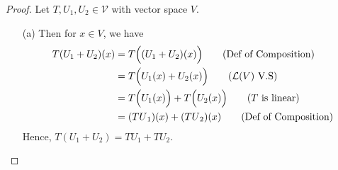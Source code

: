 \begin{proof}
    Let \( T, {U}_{1}, {U}_{2} \in \mathcal{V} \) with vector space \( V  \). 
    \begin{enumerate}
        \item[(a)] Then for \( x \in V  \), we have
    \begin{align*}
        T({U}_{1} + {U}_{2})(x) &= T \Big( ({U}_{1} + {U}_{2})(x) \Big) \tag{Def of Composition}   \\
                             &= T \Big( {U}_{1}(x) + {U}_{2}(x) \Big) \tag{\( \mathcal{L}(V) \) V.S} \\
                             &= T \Big( {U}_{1}(x) \Big) + T \Big( {U}_{2}(x) \Big) \tag{\( T \) is linear} \\  
                             &= ({TU}_{1})(x) +  ({TU}_{2})(x) \tag{Def of Composition} \\
    \end{align*}
    Hence, \( T({U}_{1} + {U}_{2}) = {TU}_{1} + {TU}_{2} \).
        

\end{enumerate}
\end{proof}
